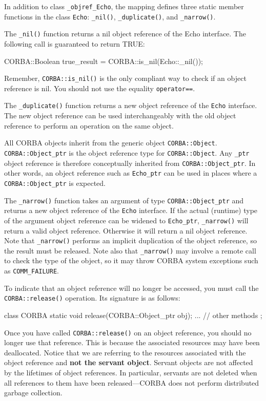 \documentclass[11pt,twoside,a4paper]{book}
\newcommand{\type}[1]{\texttt{#1}}
\newcommand{\intf}[1]{\texttt{#1}}
\newcommand{\code}[1]{\texttt{#1}}
\newcommand{\op}[1]{\texttt{#1()}}
\newcommand{\dsc}{\discretionary{}{}{}}
\begin{document}
In addition to class \type{\_objref\_Echo}, the mapping defines three
static member functions in the class \type{Echo}: \op{\_nil},
\op{\_duplicate}, and \op{\_narrow}.

The \op{\_nil} function returns a nil object reference of the Echo
interface. The following call is guaranteed to return TRUE:

\begin{cxxlisting}
CORBA::Boolean true_result = CORBA::is_nil(Echo::_nil());
\end{cxxlisting}

Remember, \op{CORBA::is\_nil} is the only compliant way to check if an
object reference is nil. You should not use the equality
\code{operator==}.

The \op{\_duplicate} function returns a new object reference of the
\intf{Echo} interface. The new object reference can be used
interchangeably with the old object reference to perform an operation
on the same object.

All CORBA objects inherit from the generic object
\type{CORBA::Object}.  \type{CORBA::\dsc{}Object\_ptr} is the object
reference type for \type{CORBA::Object}.  Any \type{\_ptr} object
reference is therefore conceptually inherited from
\type{CORBA::Object\_ptr}. In other words, an object reference such as
\type{Echo\_ptr} can be used in places where a
\type{CORBA::Object\_ptr} is expected.

The \op{\_narrow} function takes an argument of type
\type{CORBA::Object\_ptr} and returns a new object reference of the
\intf{Echo} interface.  If the actual (runtime) type of the argument
object reference can be widened to \type{Echo\_ptr}, \op{\_narrow}
will return a valid object reference. Otherwise it will return a nil
object reference. Note that \op{\_narrow} performs an implicit
duplication of the object reference, so the result must be released.
Note also that \op{\_narrow} may involve a remote call to check the
type of the object, so it may throw CORBA system exceptions such as
\code{COMM\_FAILURE}.

To indicate that an object reference will no longer be accessed, you
must call the \op{CORBA::release} operation. Its signature is as
follows:

\begin{cxxlisting}
class CORBA {
  static void release(CORBA::Object_ptr obj);
  ... // other methods
};
\end{cxxlisting}

Once you have called \op{CORBA::release} on an object reference, you
should no longer use that reference. This is because the associated
resources may have been deallocated. Notice that we are referring to
the resources associated with the object reference and \textbf{not the
servant object}. Servant objects are not affected by the lifetimes of
object references. In particular, servants are not deleted when all
references to them have been released---CORBA does not perform
distributed garbage collection.
\end{document}
